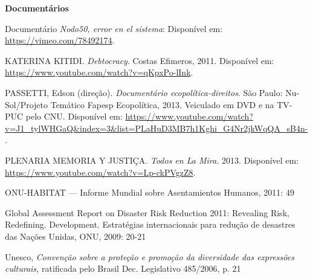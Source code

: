 \textbf{Documentários}

Documentário \emph{Nodo50, error en el sistema}: Disponível em:
\url{https://vimeo.com/78492174}.

KATERINA KITIDI. \emph{Debtocracy}. Costas Efimeros, 2011. Disponível
em: \url{https://www.youtube.com/watch?v=qKpxPo-lInk}.

PASSETTI, Edson (direção). \emph{Documentário ecopolítica-direitos}. São
Paulo: Nu-Sol/Projeto Temático Fapesp Ecopolítica, 2013. Veiculado em
DVD e na TV-PUC pelo CNU. Disponível em:
\url{https://www.youtube.com/watch?v=J1_tylWHGaQ\&index=3\&list=PLaHuD3MB7h1Kghi_G4Nr2jkWqQA_sB4n-}.

PLENARIA MEMORIA Y JUSTIÇA. \emph{Todos en La Mira.} 2013. Disponível
em: \url{https://www.youtube.com/watch?v=Lp-ckPVgzZ8}.

ONU-HABITAT --- Informe Mundial sobre Asentamientos Humanos, 2011: 49

Global Assessment Report on Disaster Risk Reduction 2011: Revealing
Risk, Redefining. Development. Estratégias internacionais para redução
de desastres das Nações Unidas, ONU, 2009: 20-21

Unesco, \emph{Convenção sobre a proteção e promoção da diversidade das
expressões culturais,} ratificada pelo Brasil Dec. Legislativo 485/2006,
p. 21
